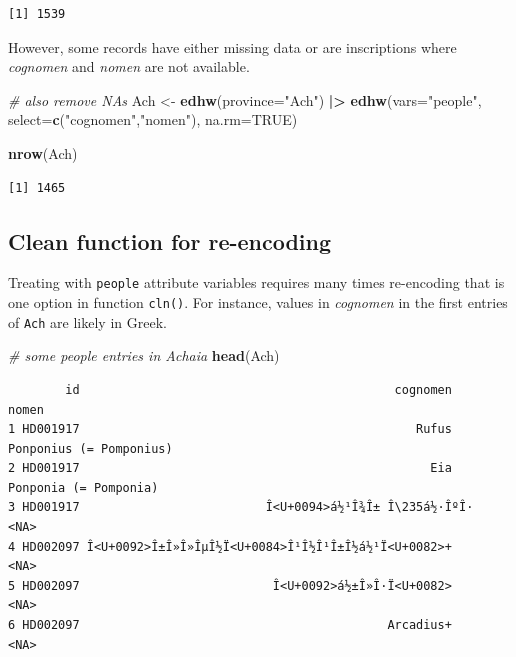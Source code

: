 \documentclass[a4paper,11pt]{memoir}
\newenvironment{Shaded}{\begin{snugshade}}{\end{snugshade}}
\newcommand{\CommentTok}[1]{\textcolor[rgb]{0.56,0.35,0.01}{\textit{#1}}}
\newcommand{\DataTypeTok}[1]{\textcolor[rgb]{0.13,0.29,0.53}{#1}}
\newcommand{\ErrorTok}[1]{\textcolor[rgb]{0.64,0.00,0.00}{\textbf{#1}}}
\newcommand{\KeywordTok}[1]{\textcolor[rgb]{0.13,0.29,0.53}{\textbf{#1}}}
\newcommand{\NormalTok}[1]{#1}
\newcommand{\OperatorTok}[1]{\textcolor[rgb]{0.81,0.36,0.00}{\textbf{#1}}}
\newcommand{\OtherTok}[1]{\textcolor[rgb]{0.56,0.35,0.01}{#1}}
\newcommand{\StringTok}[1]{\textcolor[rgb]{0.31,0.60,0.02}{#1}}
\begin{document}
\begin{verbatim}
[1] 1539
\end{verbatim}

However, some records have either missing data or are inscriptions where
\emph{cognomen} and \emph{nomen} are not available.

\begin{Shaded}
\begin{Highlighting}[]
\CommentTok{# also remove NAs}
\NormalTok{Ach <-}\StringTok{ }\KeywordTok{edhw}\NormalTok{(}\DataTypeTok{province=}\StringTok{"Ach"}\NormalTok{) }\OperatorTok{|}\ErrorTok{>}\StringTok{ }
\StringTok{  }\KeywordTok{edhw}\NormalTok{(}\DataTypeTok{vars=}\StringTok{"people"}\NormalTok{, }\DataTypeTok{select=}\KeywordTok{c}\NormalTok{(}\StringTok{"cognomen"}\NormalTok{,}\StringTok{"nomen"}\NormalTok{), }\DataTypeTok{na.rm=}\OtherTok{TRUE}\NormalTok{)}

\KeywordTok{nrow}\NormalTok{(Ach)}
\end{Highlighting}
\end{Shaded}

\begin{verbatim}
[1] 1465
\end{verbatim}

\hypertarget{clean-function-for-re-encoding}{%
\subsection{Clean function for
re-encoding}\label{clean-function-for-re-encoding}}

Treating with \texttt{people} attribute variables requires many times
re-encoding that is one option in function \texttt{cln()}. For instance,
values in \emph{cognomen} in the first entries of \texttt{Ach} are
likely in Greek.

\begin{Shaded}
\begin{Highlighting}[]
\CommentTok{# some people entries in Achaia}
\KeywordTok{head}\NormalTok{(Ach)}
\end{Highlighting}
\end{Shaded}

\begin{verbatim}
        id                                            cognomen                   nomen
1 HD001917                                               Rufus Ponponius (= Pomponius)
2 HD001917                                                 Eia   Ponponia (= Pomponia)
3 HD001917                          Î<U+0094>á½¹Î¾Î± Î\235á½·ÎºÎ·                    <NA>
4 HD002097 Î<U+0092>Î±Î»Î»ÎµÎ½Ï<U+0084>Î¹Î½Î¹Î±Î½á½¹Ï<U+0082>+                    <NA>
5 HD002097                           Î<U+0092>á½±Î»Î·Ï<U+0082>                    <NA>
6 HD002097                                           Arcadius+                    <NA>
\end{verbatim}
\end{document}
